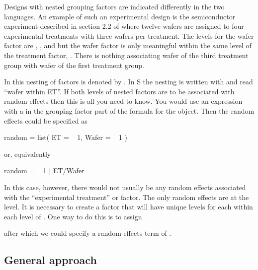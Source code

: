 \documentclass[12pt]{article}
\newcommand{\s}{\textsf{S}}
\begin{document}
Designs with nested grouping factors are indicated differently in the
two languages.  An example of such an experimental design is the
semiconductor experiment described in section 2.2 of
\citet{litt:mill:stro:wolf:1996} where twelve wafers are 
assigned to four experimental treatments with three wafers per
treatment.  The levels for the wafer factor are , , and
 but the wafer factor is only meaningful within the same level
of the treatment factor, .  There is nothing associating wafer
 of the third treatment group with wafer  of the first
treatment group.

In  this nesting of factors is denoted by .  In
\s{} the nesting is written with  and read ``wafer
within ET''.  If both levels of nested factors are to be associated
with random effects then this is all you need to know.  You would use
an expression with a  in the grouping factor part of the
formula for the  object.  Then the random effects
could be specified as
\begin{Example}
  random = list( ET = ~ 1, Wafer = ~ 1 )
\end{Example}
or, equivalently
\begin{Example}
  random = ~ 1 | ET/Wafer
\end{Example}

In this case, however, there would not usually be any random effects
associated with the ``experimental treatment'' or  factor.  The 
only random effects are at the  level.  It is necessary to
create a factor that will have unique levels for each 
within each level of .  One way to do this is to assign
\begin{Schunk}
\end{Schunk}
after which we could specify a random effects term of .

\subsection{General approach}
\label{sec:generalApproach}
\end{document}
